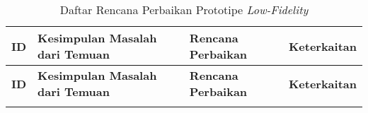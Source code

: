 \RaggedLeft
\begin{footnotesize}
\begin{longtable}[c]{|W{c}{0.06\textwidth}|>{\ccnormspacing}m{0.32\textwidth}|>{\ccnormspacing}m{0.35\textwidth}|>{\ccnormspacingcenter}m{0.14\textwidth}|}
  \caption{Daftar Rencana Perbaikan Prototipe \textit{Low-Fidelity}}
  \label{tab:daftar_perbaikan_lofi} \\
  \hline {}
  \textbf{ID} & \centering\textbf{Kesimpulan Masalah dari Temuan} & \centering\textbf{Rencana Perbaikan} & \textbf{Keterkaitan} \\ \hline \endfirsthead
  \hline {}
  \textbf{ID} & \centering\textbf{Kesimpulan Masalah dari Temuan} & \centering\textbf{Rencana Perbaikan} & \textbf{Keterkaitan} \\ \hline \endhead
  \hline \endfoot


\end{longtable}
\end{footnotesize}
